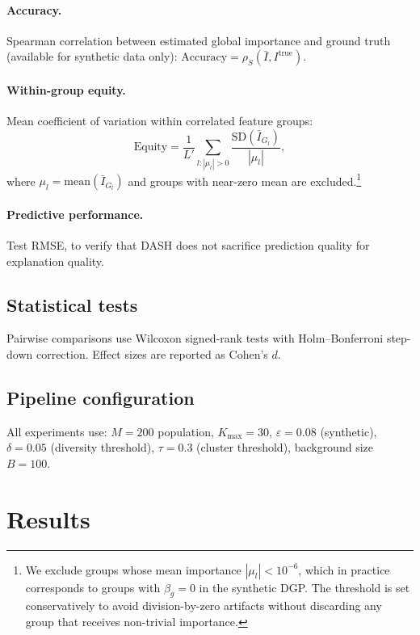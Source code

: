 \documentclass[10pt]{article}
\newcommand{\dash}{\textsc{DASH}}
\begin{document}
\paragraph{Accuracy.}
Spearman correlation between estimated global importance and ground truth
(available for synthetic data only):
$\text{Accuracy} = \rho_S(\bar{I}, I^{\text{true}})$.

\paragraph{Within-group equity.}
Mean coefficient of variation within correlated feature groups:
\begin{equation}
  \text{Equity} = \frac{1}{L'} \sum_{l : |\mu_l| > 0}
    \frac{\text{SD}(\bar{I}_{G_l})}{|\mu_l|},
\end{equation}
where $\mu_l = \text{mean}(\bar{I}_{G_l})$ and groups with near-zero
mean are excluded.\footnote{We exclude groups whose mean importance
$|\mu_l| < 10^{-6}$, which in practice corresponds to groups with
$\beta_g = 0$ in the synthetic DGP. The threshold is set conservatively
to avoid division-by-zero artifacts without discarding any group that
receives non-trivial importance.}

\paragraph{Predictive performance.}
Test RMSE, to verify that \dash{} does not sacrifice prediction quality
for explanation quality.

\subsection{Statistical tests}

Pairwise comparisons use Wilcoxon signed-rank tests with Holm--Bonferroni
step-down correction. Effect sizes are reported as Cohen's $d$.

\subsection{Pipeline configuration}

All experiments use: $M = 200$ population, $K_{\max} = 30$,
$\varepsilon = 0.08$ (synthetic), $\delta = 0.05$ (diversity threshold),
$\tau = 0.3$ (cluster threshold), background size $B = 100$.


\section{Results}
\label{sec:results}
\end{document}
